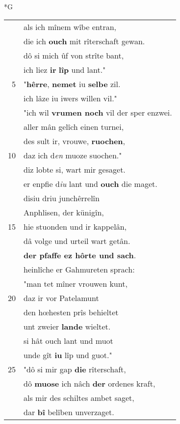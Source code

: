 \documentclass[8pt,a4paper,notitlepage]{article}
\begin{document}
\newpage
\begin{table}[ht]
\begin{minipage}[t]{0.5\linewidth}
\small
\begin{center}*G
\end{center}
\begin{tabular}{rl}
 & als ich mînem wîbe entran,\\ 
 & die ich \textbf{ouch} mit rîterschaft gewan.\\ 
 & dô si mich ûf von strîte bant,\\ 
 & ich liez \textbf{ir} \textbf{lîp} und lant."\\ 
5 & "\textbf{hêrre}, \textbf{nemet} iu \textbf{selbe} zil.\\ 
 & ich lâze iu iwers willen vil."\\ 
 & "ich wil \textbf{vrumen noch} vil der sper enzwei.\\ 
 & aller mân gelîch einen turnei,\\ 
 & des sult ir, vrouwe, \textbf{ruochen},\\ 
10 & daz ich d\textit{en} muoze suochen."\\ 
 & diz lobte si, wart mir gesaget.\\ 
 & er enpfie d\textit{iu} lant und \textbf{ouch} die maget.\\ 
 & disiu driu junchêrrelîn\\ 
 & Anphlisen, der künigîn,\\ 
15 & hie stuonden und ir kappelân,\\ 
 & dâ volge und urteil wart getân.\\ 
 & \textbf{der pfaffe ez hôrte und sach}.\\ 
 & heinlîche er Gahmureten sprach:\\ 
 & "man tet mîner vrouwen kunt,\\ 
20 & daz ir vor Patelamunt\\ 
 & den hœhesten prîs behieltet\\ 
 & unt zweier \textbf{lande} wieltet.\\ 
 & si hât ouch lant und muot\\ 
 & unde gît \textbf{iu} lîp und guot."\\ 
25 & "dô si mir gap \textbf{die} rîterschaft,\\ 
 & dô \textbf{muose} ich nâch \textbf{der} ordenes kraft,\\ 
 & als mir des schiltes ambet saget,\\ 
 & dar \textbf{bî} belîben unverzaget.\\ 

\end{tabular}
\end{minipage}
\end{table}
\end{document}
